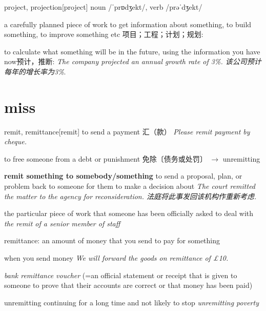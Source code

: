 \begin{DefWord}{project, projection}[project]
noun  /ˈprɒdʒekt/, verb /prəˈdʒekt/

a carefully planned piece of work to get information about something, to build something, to improve something etc 项目；工程；计划；规划:

to calculate what something will be in the future, using the information you have now预计，推断:
 \textit{The company projected an annual growth rate of 3\%. 该公司预计每年的增长率为3\%}. 

\end{DefWord}









\section{miss}

\begin{DefWord}{remit, remittance}[remit]
    to send a payment 汇（款）
    \textit{Please remit payment by cheque.}

    to free someone from a debt or punishment 免除〔债务或处罚〕 $\rightarrow$  unremitting

    \textbf{remit something to somebody/something}
    to send a proposal, plan, or problem back to someone for them to make a decision about
    \textit{The court remitted the matter to the agency for reconsideration. 法庭将此事发回该机构作重新考虑. }

    the particular piece of work that someone has been officially asked to deal with
    \textit{the remit of a senior member of staff}

    remittance: an amount of money that you send to pay for something

    when you send money
    \textit{We will forward the goods on remittance of £10.}

    \textit{bank remittance voucher} (=an official statement or receipt that is given to someone to prove that their accounts are correct or that money has been paid)
\end{DefWord}

\begin{DefWord}{unremitting}
    continuing for a long time and not likely to stop
    \textit{unremitting poverty}
\end{DefWord}

